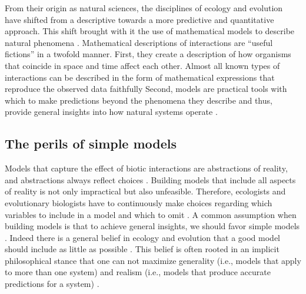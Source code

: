 \documentclass[12pt]{article}
\begin{document}
From their origin as natural sciences, the disciplines of ecology and evolution have shifted from a descriptive towards a more predictive and quantitative approach. This shift brought with it the use of mathematical models to describe natural phenomena \citep{maynard1978models,rossberg2019let}. Mathematical descriptions of interactions are ``useful fictions'' \citep{box2011statistical} in a twofold manner. First, they create a description of how organisms that coincide in space and time affect each other. Almost all known types of interactions can be described in the form of mathematical expressions that reproduce the observed data faithfully \citep{volterra1926fluctuations,holling1959some,holt1977predation,adler2018competition,wood1999super,holland2002population,vazquez2005interaction,stouffer2021hidden}  Second, models are practical tools with which to make predictions beyond the phenomena they describe and thus, provide general insights into how natural systems operate \citep{evans2012predictive,stouffer2019all,rossberg2019let}.



\subsection*{The perils of simple models}
Models that capture the effect of biotic interactions are abstractions of reality, and abstractions always reflect choices \citep{levins2006strategies}. Building models that include all aspects of reality is not only impractical but also unfeasible.  Therefore, ecologists and evolutionary biologists have to continuously make choices regarding which variables to include in a model and which to omit \citep{evans2012predictive, rossberg2019let}. A common assumption when building models is that to achieve general insights, we should favor simple models \citep{evans2013simple}. Indeed there is a general belief in ecology and evolution that a good model should include as little as possible \citep{evans2013simple,orzack2012philosophy}. This belief is often rooted in an implicit philosophical stance that one can not maximize generality (i.e., models that apply to more than one system) and realism (i.e., models that produce accurate predictions for a system) \citep{levins2006strategies,evans2012predictive}.
\end{document}
